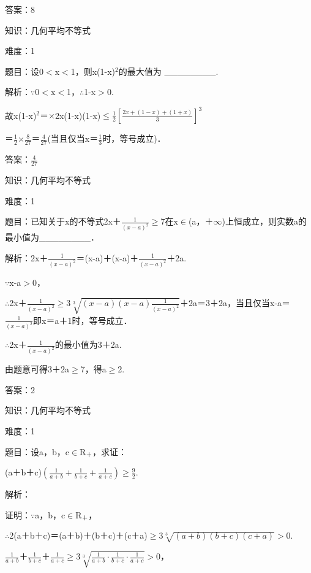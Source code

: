 \documentclass{article} %
\begin{document}
答案：8



知识：几何平均不等式

难度：1

题目：设0$\mathrm{<}$x$\mathrm{<}$1，则x(1-x)${}^{2}$的最大值为 \_\_\_\_\_\_\_\_.

解析：$\mathrm{\because}$0$\mathrm{<}$x$\mathrm{<}$1，$\mathrm{\therefore}$1-x$\mathrm{>}$0.

故x(1-x)${}^{2}$＝$\mathrm{\times}$2x(1-x)(1-x)$\mathrm{\le}$$\frac{1}{2}[\frac{2x+(1-x)+(1+x)}{3}]^3$

＝$\frac{1}{2}\mathrm{\times}\frac{8}{27}$＝$\frac{4}{27}$(当且仅当x＝$\frac{1}{3}$时，等号成立)．

答案：$\frac{4}{27}$



知识：几何平均不等式

难度：1

题目：已知关于x的不等式2x＋$\frac{1}{(x-a)^2}$$\mathrm{\ge}$7在x$\mathrm{\in}$(a，＋$\mathrm{\infty}$)上恒成立，则实数a的最小值为\_\_\_\_\_\_\_\_．

解析：2x＋$\frac{1}{(x-a)^2}$＝(x-a)＋(x-a)＋$\frac{1}{(x-a)^2}$＋2a.

$\mathrm{\because}$x-a$\mathrm{>}$0，

$\mathrm{\therefore}$2x＋$\frac{1}{(x-a)^2}$$\mathrm{\ge}$3$\sqrt[3]{(x-a)(x-a)\frac{1}{(x-a)^2}}$＋2a＝3＋2a，当且仅当x-a＝$\frac{1}{(x-a)^2}$即x＝a＋1时，等号成立．

$\mathrm{\therefore}$2x＋$\frac{1}{(x-a)^2}$的最小值为3＋2a.

由题意可得3＋2a$\mathrm{\ge}$7，得a$\mathrm{\ge}$2.

答案：2



知识：几何平均不等式

难度：1

题目：设a，b，c$\mathrm{\in}$R${}_{\textrm{＋}}$，求证：

(a＋b＋c)$(\frac{1}{a+b}+\frac{1}{b+c}+\frac{1}{a+c})$$\mathrm{\ge}\frac{9}{2}$.

解析：

证明：$\mathrm{\because}$a，b，c$\mathrm{\in}$R${}_{\textrm{＋}}$，

$\mathrm{\therefore}$2(a＋b＋c)＝(a＋b)＋(b＋c)＋(c＋a)$\mathrm{\ge}$3$\sqrt[3]{(a+b)(b+c)(c+a)}$$\mathrm{>}$0.

$\frac{1}{a+b}$＋$\frac{1}{b+c}$＋$\frac{1}{a+c}$$\mathrm{\ge}$3$\sqrt[3]{\frac{1}{a+b}\cdot\frac{1}{b+c}\cdot\frac{1}{a+c}}$$\mathrm{>}$0，
\end{document}

